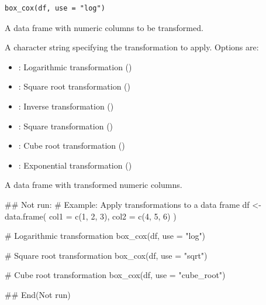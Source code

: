 \documentclass[a4paper]{book}
\begin{document}
%
\begin{Usage}
\begin{verbatim}
box_cox(df, use = "log")
\end{verbatim}
\end{Usage}
%
\begin{Arguments}
\begin{ldescription}
\item[\code{df}] A data frame with numeric columns to be transformed.

\item[\code{use}] A character string specifying the transformation to apply. Options are:
\begin{itemize}

\item{} : Logarithmic transformation ()
\item{} : Square root transformation ()
\item{} : Inverse transformation ()
\item{} : Square transformation ()
\item{} : Cube root transformation ()
\item{} : Exponential transformation ()

\end{itemize}

\end{ldescription}
\end{Arguments}
%
\begin{Value}
A data frame with transformed numeric columns.
\end{Value}
%
\begin{Examples}
\begin{ExampleCode}
\#\# Not run: 
# Example: Apply transformations to a data frame
df <- data.frame(
  col1 = c(1, 2, 3),
  col2 = c(4, 5, 6)
)

# Logarithmic transformation
box_cox(df, use = "log")

# Square root transformation
box_cox(df, use = "sqrt")

# Cube root transformation
box_cox(df, use = "cube_root")

## End(Not run)
\end{ExampleCode}
\end{Examples}
\end{document}
